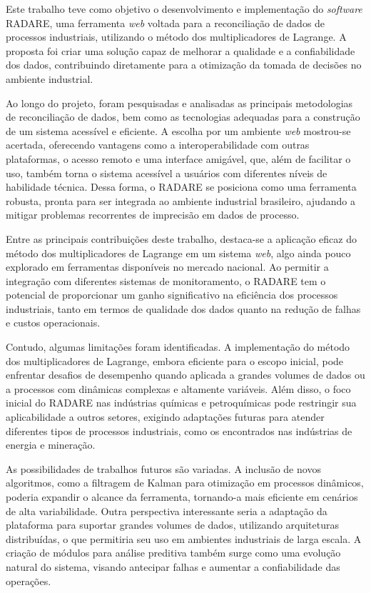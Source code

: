 \label{Cap:Conclusao}

Este trabalho teve como objetivo o desenvolvimento e implementação do \textit{software} RADARE, uma ferramenta \textit{web} voltada para a reconciliação de dados de processos industriais, utilizando o método dos multiplicadores de Lagrange. A proposta foi criar uma solução capaz de melhorar a qualidade e a confiabilidade dos dados, contribuindo diretamente para a otimização da tomada de decisões no ambiente industrial.

Ao longo do projeto, foram pesquisadas e analisadas as principais metodologias de reconciliação de dados, bem como as tecnologias adequadas para a construção de um sistema acessível e eficiente. A escolha por um ambiente \textit{web} mostrou-se acertada, oferecendo vantagens como a interoperabilidade com outras plataformas, o acesso remoto e uma interface amigável, que, além de facilitar o uso, também torna o sistema acessível a usuários com diferentes níveis de habilidade técnica. Dessa forma, o RADARE se posiciona como uma ferramenta robusta, pronta para ser integrada ao ambiente industrial brasileiro, ajudando a mitigar problemas recorrentes de imprecisão em dados de processo.

Entre as principais contribuições deste trabalho, destaca-se a aplicação eficaz do método dos multiplicadores de Lagrange em um sistema \textit{web}, algo ainda pouco explorado em ferramentas disponíveis no mercado nacional. Ao permitir a integração com diferentes sistemas de monitoramento, o RADARE tem o potencial de proporcionar um ganho significativo na eficiência dos processos industriais, tanto em termos de qualidade dos dados quanto na redução de falhas e custos operacionais.

Contudo, algumas limitações foram identificadas. A implementação do método dos multiplicadores de Lagrange, embora eficiente para o escopo inicial, pode enfrentar desafios de desempenho quando aplicada a grandes volumes de dados ou a processos com dinâmicas complexas e altamente variáveis. Além disso, o foco inicial do RADARE nas indústrias químicas e petroquímicas pode restringir sua aplicabilidade a outros setores, exigindo adaptações futuras para atender diferentes tipos de processos industriais, como os encontrados nas indústrias de energia e mineração.

As possibilidades de trabalhos futuros são variadas. A inclusão de novos algoritmos, como a filtragem de Kalman para otimização em processos dinâmicos, poderia expandir o alcance da ferramenta, tornando-a mais eficiente em cenários de alta variabilidade. Outra perspectiva interessante seria a adaptação da plataforma para suportar grandes volumes de dados, utilizando arquiteturas distribuídas, o que permitiria seu uso em ambientes industriais de larga escala. A criação de módulos para análise preditiva também surge como uma evolução natural do sistema, visando antecipar falhas e aumentar a confiabilidade das operações.

